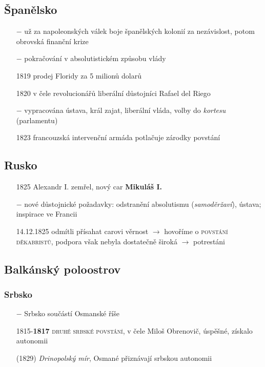 \documentclass{article}
\begin{document}
\subsection*{Španělsko}
\begin{itemize}
    \vspace{-0.5em}
    \setlength\itemsep{0.15em}
    \item[$-$] už za napoleonských válek boje španělských kolonií za nezávislost, potom obrovská finanční krize
    \item[$-$] pokračování v absolutistickém způsobu vlády
    \item[1819] prodej Floridy za 5 milionů dolarů
    \item[1820] v čele revolucionářů liberální důstojníci Rafael del Riego
    \item[$-$] vypracována ústava, král zajat, liberální vláda, volby do \textit{kortesu} (parlamentu)
    \item[1823] francouzská intervenční armáda potlačuje zárodky povstání
\end{itemize}

\subsection*{Rusko}
\begin{itemize}
    \vspace{-0.5em}
    \setlength\itemsep{0.15em}
    \item[1825] Alexandr I. zemřel, nový car \textbf{Mikuláš I.}
    \item[$-$] nové důstojnické požadavky: odstranění absolutismu (\textit{samoděržaví}), ústava; inspirace ve Francii
    \item[14.12.1825] odmítli přísahat carovi věrnost $\rightarrow$ hovoříme o \textsc{povstání děkabristů}, podpora však nebyla dostatečně široká $\rightarrow$ potrestáni
\end{itemize}


\subsection*{Balkánský poloostrov}
\subsubsection*{Srbsko}
\begin{itemize}
    \vspace{-0.5em}
    \setlength\itemsep{0.15em}
    \item[$-$] Srbsko součástí Osmanské říše
    \item[1815-\textbf{1817}] \textsc{druhé srbské povstání}, v čele Miloš Obrenovič, úspěšné, získalo autonomii
    \item[(1829)] \textit{Drinopolský mír}, Osmané přiznávají srbskou autonomii
\end{itemize}
\end{document}
